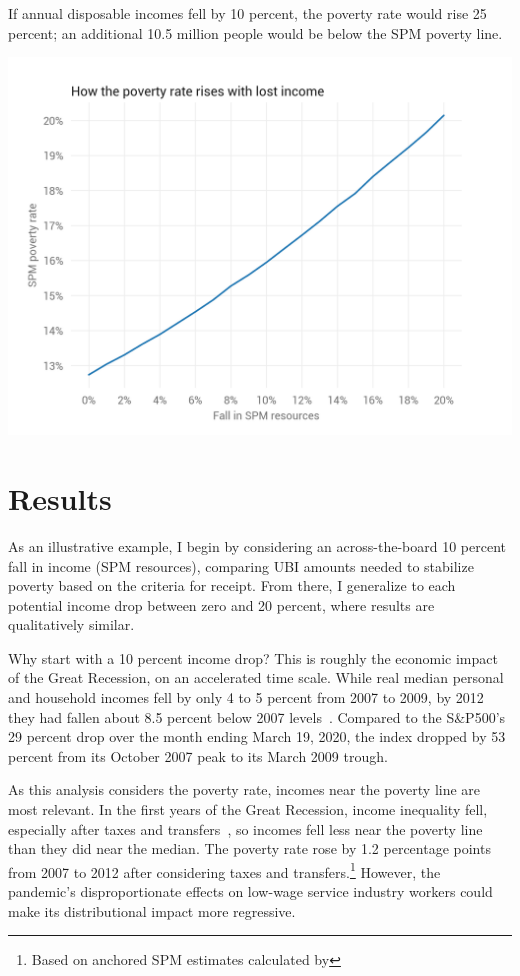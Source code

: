 \documentclass[12pt]{article}
\begin{document}
If annual disposable incomes fell by 10 percent, the poverty rate would rise 25 percent; an additional 10.5 million people would be below the SPM poverty line.

\begin{center}
\includegraphics[width=15cm]{pov_rate_income.png}
\label{fig:pov_rate_income}
\end{center}


\section{Results} \label{sec:results}

As an illustrative example, I begin by considering an across-the-board 10 percent fall in income (SPM resources), comparing UBI amounts needed to stabilize poverty based on the criteria for receipt. From there, I generalize to each potential income drop between zero and 20 percent, where results are qualitatively similar.

Why start with a 10 percent income drop? This is roughly the economic impact of the Great Recession, on an accelerated time scale. While real median personal and household incomes fell by only 4 to 5 percent from 2007 to 2009, by 2012 they had fallen about 8.5 percent below 2007 levels~\cite{fred_income}. Compared to the S\&P500's 29 percent drop over the month ending March 19, 2020, the index dropped by 53 percent from its October 2007 peak to its March 2009 trough.

As this analysis considers the poverty rate, incomes near the poverty line are most relevant. In the first years of the Great Recession, income inequality fell, especially after taxes and transfers~\cite{cbo}, so incomes fell less near the poverty line than they did near the median. The poverty rate rose by 1.2 percentage points from 2007 to 2012 after considering taxes and transfers.\footnote{Based on anchored SPM estimates calculated by } However, the pandemic's disproportionate effects on low-wage service industry workers could make its distributional impact more regressive.
\end{document}
